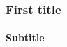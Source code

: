 \documentclass{beamer}
\begin{document}
\begin{frame}
 \frametitle{First title}
 \framesubtitle{Subtitle}
\end{frame}
\end{document}
